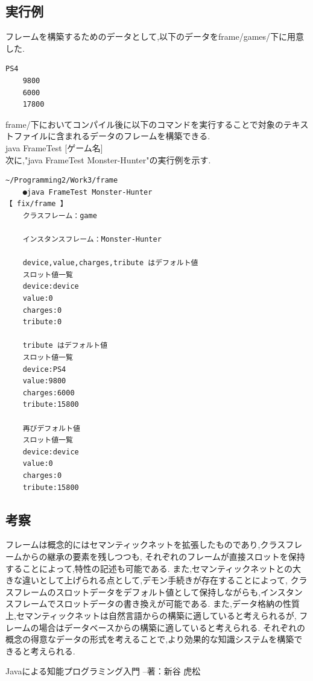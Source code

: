 \documentclass[uplatex,12pt]{jsarticle}
\begin{document}
\subsection{実行例}
フレームを構築するためのデータとして,以下のデータをframe/games/下に用意した.
\begin{lstlisting}[caption=frame/games/Monster-Hunter.txt, label=mid]
    PS4
    9800
    6000
    17800
\end{lstlisting}
frame/下においてコンパイル後に以下のコマンドを実行することで対象のテキストファイルに含まれるデータのフレームを構築できる. \\
java FrameTest [ゲーム名] \\
次に,"java FrameTest Monster-Hunter"の実行例を示す.
\begin{lstlisting}[caption=java FrameTest Monster-Hunterの実行例, label=mid]
    ~/Programming2/Work3/frame
    ●java FrameTest Monster-Hunter                                                                                                                                                                                                【 fix/frame 】
    クラスフレーム：game

    インスタンスフレーム：Monster-Hunter

    device,value,charges,tribute はデフォルト値
    スロット値一覧
    device:device
    value:0
    charges:0
    tribute:0

    tribute はデフォルト値
    スロット値一覧
    device:PS4
    value:9800
    charges:6000
    tribute:15800

    再びデフォルト値
    スロット値一覧
    device:device
    value:0
    charges:0
    tribute:15800
\end{lstlisting}

\subsection{考察}
フレームは概念的にはセマンティックネットを拡張したものであり,クラスフレームからの継承の要素を残しつつも,
それぞれのフレームが直接スロットを保持することによって,特性の記述も可能である.
また,セマンティックネットとの大きな違いとして上げられる点として,デモン手続きが存在することによって,
クラスフレームのスロットデータをデフォルト値として保持しながらも,インスタンスフレームでスロットデータの書き換えが可能である.
また,データ格納の性質上,セマンティックネットは自然言語からの構築に適していると考えられるが,
フレームの場合はデータベースからの構築に適していると考えられる.
それぞれの概念の得意なデータの形式を考えることで,より効果的な知識システムを構築できると考えられる.

\begin{thebibliography}{99}
 Javaによる知能プログラミング入門 --著：新谷 虎松 \\
\end{thebibliography}
\end{document}
